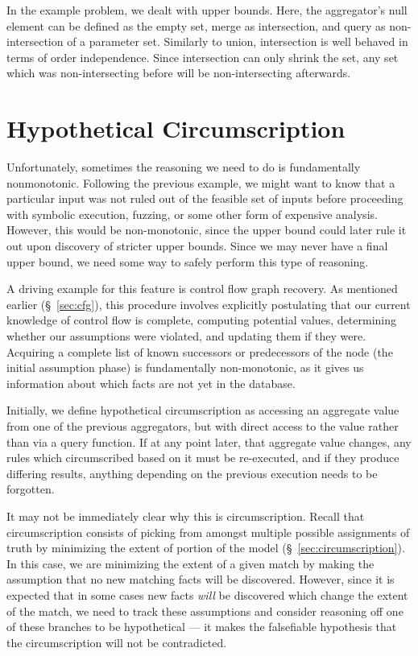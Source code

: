 In the example problem, we dealt with upper bounds.
Here, the aggregator's null element can be defined as the empty set, merge as intersection, and query as non-intersection of a parameter set.
Similarly to union, intersection is well behaved in terms of order independence.
Since intersection can only shrink the set, any set which was non-intersecting before will be non-intersecting afterwards.

\section{Hypothetical Circumscription}
\label{sec:hypcirc}
Unfortunately, sometimes the reasoning we need to do is fundamentally nonmonotonic.
Following the previous example, we might want to know that a particular input was not ruled out of the feasible set of inputs before proceeding with symbolic execution, fuzzing, or some other form of expensive analysis.
However, this would be non-monotonic, since the upper bound could later rule it out upon discovery of stricter upper bounds.
Since we may never have a final upper bound, we need some way to safely perform this type of reasoning.

A driving example for this feature is control flow graph recovery.
As mentioned earlier (\S~\ref{sec:cfg}), this procedure involves explicitly postulating that our current knowledge of control flow is complete, computing potential values, determining whether our assumptions were violated, and updating them if they were.
Acquiring a complete list of known successors or predecessors of the node (the initial assumption phase) is fundamentally non-monotonic, as it gives us information about which facts are not yet in the database.

Initially, we define hypothetical circumscription as accessing an aggregate value from one of the previous aggregators, but with direct access to the value rather than via a query function.
If at any point later, that aggregate value changes, any rules which circumscribed based on it must be re-executed, and if they produce differing results, anything depending on the previous execution needs to be forgotten.

It may not be immediately clear why this is circumscription.
Recall that circumscription consists of picking from amongst multiple possible assignments of truth by minimizing the extent of portion of the model (\S~\ref{sec:circumscription}).
In this case, we are minimizing the extent of a given match by making the assumption that no new matching facts will be discovered.
However, since it is expected that in some cases new facts \emph{will} be discovered which change the extent of the match, we need to track these assumptions and consider reasoning off one of these branches to be hypothetical --- it makes the falsefiable hypothesis that the circumscription will not be contradicted.

